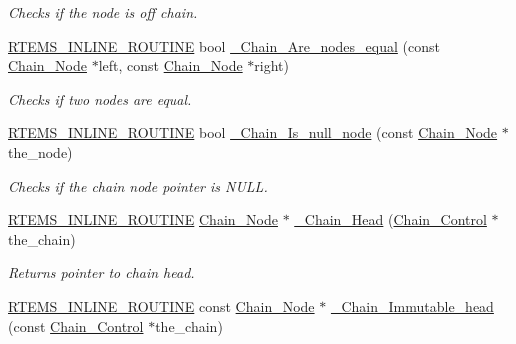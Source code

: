 \begin{DoxyCompactItemize}
\begin{DoxyCompactList}\small\item\em Checks if the node is off chain. \end{DoxyCompactList}\item 
\mbox{\hyperlink{group__RTEMSScoreBaseDefs_gac216239df231d5dbd15e3520b0b9313f}{R\+T\+E\+M\+S\+\_\+\+I\+N\+L\+I\+N\+E\+\_\+\+R\+O\+U\+T\+I\+NE}} bool \mbox{\hyperlink{group__RTEMSScoreChain_ga5086ac96a84ab6522667829037b8a7e2}{\+\_\+\+Chain\+\_\+\+Are\+\_\+nodes\+\_\+equal}} (const \mbox{\hyperlink{group__RTEMSScoreChain_ga0dd4bfcca1ac7f90de2842e447846d3d}{Chain\+\_\+\+Node}} $\ast$left, const \mbox{\hyperlink{group__RTEMSScoreChain_ga0dd4bfcca1ac7f90de2842e447846d3d}{Chain\+\_\+\+Node}} $\ast$right)
\begin{DoxyCompactList}\small\item\em Checks if two nodes are equal. \end{DoxyCompactList}\item 
\mbox{\hyperlink{group__RTEMSScoreBaseDefs_gac216239df231d5dbd15e3520b0b9313f}{R\+T\+E\+M\+S\+\_\+\+I\+N\+L\+I\+N\+E\+\_\+\+R\+O\+U\+T\+I\+NE}} bool \mbox{\hyperlink{group__RTEMSScoreChain_gaa0e3746a0f08242d67fe3f2198f2c6d6}{\+\_\+\+Chain\+\_\+\+Is\+\_\+null\+\_\+node}} (const \mbox{\hyperlink{group__RTEMSScoreChain_ga0dd4bfcca1ac7f90de2842e447846d3d}{Chain\+\_\+\+Node}} $\ast$the\+\_\+node)
\begin{DoxyCompactList}\small\item\em Checks if the chain node pointer is N\+U\+LL. \end{DoxyCompactList}\item 
\mbox{\hyperlink{group__RTEMSScoreBaseDefs_gac216239df231d5dbd15e3520b0b9313f}{R\+T\+E\+M\+S\+\_\+\+I\+N\+L\+I\+N\+E\+\_\+\+R\+O\+U\+T\+I\+NE}} \mbox{\hyperlink{group__RTEMSScoreChain_ga0dd4bfcca1ac7f90de2842e447846d3d}{Chain\+\_\+\+Node}} $\ast$ \mbox{\hyperlink{group__RTEMSScoreChain_ga8b66d3138b9cdacbcb0600c42237ff7d}{\+\_\+\+Chain\+\_\+\+Head}} (\mbox{\hyperlink{unionChain__Control}{Chain\+\_\+\+Control}} $\ast$the\+\_\+chain)
\begin{DoxyCompactList}\small\item\em Returns pointer to chain head. \end{DoxyCompactList}\item 
\mbox{\hyperlink{group__RTEMSScoreBaseDefs_gac216239df231d5dbd15e3520b0b9313f}{R\+T\+E\+M\+S\+\_\+\+I\+N\+L\+I\+N\+E\+\_\+\+R\+O\+U\+T\+I\+NE}} const \mbox{\hyperlink{group__RTEMSScoreChain_ga0dd4bfcca1ac7f90de2842e447846d3d}{Chain\+\_\+\+Node}} $\ast$ \mbox{\hyperlink{group__RTEMSScoreChain_ga88bf8739d7ea05e614b67cb652191795}{\+\_\+\+Chain\+\_\+\+Immutable\+\_\+head}} (const \mbox{\hyperlink{unionChain__Control}{Chain\+\_\+\+Control}} $\ast$the\+\_\+chain)

\end{DoxyCompactItemize}
